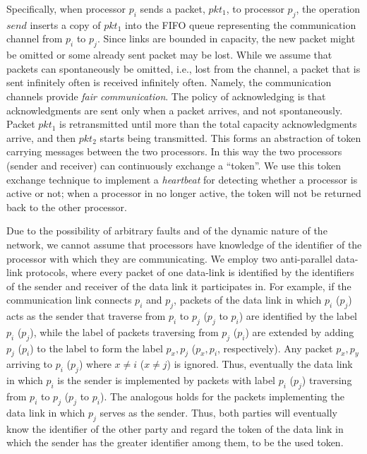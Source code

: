 \documentclass[11pt]{article}
\begin{document}
Specifically, when processor $p_i$ sends a packet, $pkt_1$, to processor $p_j$, the operation $send$ inserts a copy of $pkt_1$ into the FIFO queue representing the communication channel from $p_i$ to $p_j$. 
Since links are bounded in capacity, the new packet might be omitted or some already sent packet may be lost. 
While we assume that packets can spontaneously be omitted, i.e., lost from the channel, a packet that is sent infinitely often is received infinitely often. Namely, the communication channels provide \textit{fair communication}.
The policy of acknowledging is that acknowledgments are sent only when a packet arrives, and not spontaneously. 
Packet $pkt_1$ is retransmitted until more than the total capacity acknowledgments arrive, and then $pkt_2$ starts being transmitted. 
This forms an abstraction of token carrying messages between the two processors.
In this way the two processors (sender and receiver) can continuously exchange a ``token''.
We use this token exchange technique to implement a {\em heartbeat} for detecting  whether a processor is active or not; when a processor in no longer active, the token will not be returned back to the other processor.


Due to the possibility of arbitrary faults and of the dynamic nature of the network, we cannot assume that processors have knowledge of the identifier of the processor with which they are communicating.
We employ two anti-parallel data-link protocols, where every packet of one data-link is identified by the identifiers of the sender and receiver of the data link it participates in. 
For example, if the communication link connects $p_i$ and $p_j$, packets of the data link in which $p_i$ ($p_j$) acts as the sender that traverse from $p_i$ to $p_j$ ($p_j$ to $p_i$) are identified by the label $p_i$ ($p_j$), while the label of packets traversing from $p_j$ ($p_i$) are extended by adding $p_j$ ($p_i$) to the label to form the label $p_x,p_j$ ($p_x,p_i$, respectively).  Any packet $p_x,p_y$ arriving to $p_i$ ($p_j$) where $x \neq i$ ($x \neq j$) is ignored. Thus, eventually the data link in which $p_i$ is the sender is implemented by packets with label $p_i$ ($p_j$) traversing from $p_i$ to $p_j$ ($p_j$ to $p_i$). The analogous holds for the packets implementing the data link in which $p_j$ serves as the sender. Thus, both parties will eventually know the identifier of the other party and regard the token of the data link in which the sender has the greater identifier among them, to be the used token. 
\end{document}
